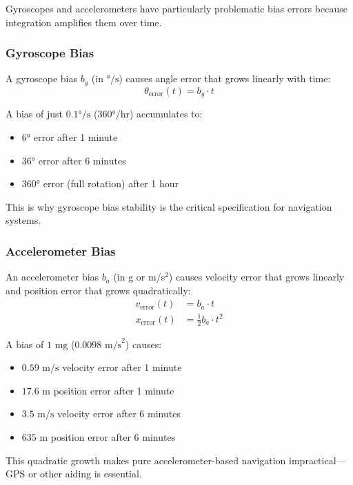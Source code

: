Gyroscopes and accelerometers have particularly problematic bias errors because integration amplifies them over time.

\subsubsection{Gyroscope Bias}

A gyroscope bias $b_g$ (in $°/\text{s}$) causes angle error that grows linearly with time:
\begin{equation}
\theta_{\text{error}}(t) = b_g \cdot t
\label{eq:gyro_bias_error}
\end{equation}

A bias of just $0.1°/\text{s}$ ($360°/\text{hr}$) accumulates to:
\begin{itemize}
    \item $6°$ error after 1 minute
    \item $36°$ error after 6 minutes
    \item $360°$ error (full rotation) after 1 hour
\end{itemize}

This is why gyroscope bias stability is the critical specification for navigation systems.

\subsubsection{Accelerometer Bias}

An accelerometer bias $b_a$ (in g or m/s$^2$) causes velocity error that grows linearly and position error that grows quadratically:
\begin{align}
v_{\text{error}}(t) &= b_a \cdot t \label{eq:accel_bias_velocity}\\
x_{\text{error}}(t) &= \frac{1}{2} b_a \cdot t^2 \label{eq:accel_bias_position}
\end{align}

A bias of $1\text{ mg}$ ($0.0098\text{ m/s}^2$) causes:
\begin{itemize}
    \item $0.59\text{ m/s}$ velocity error after 1 minute
    \item $17.6\text{ m}$ position error after 1 minute
    \item $3.5\text{ m/s}$ velocity error after 6 minutes
    \item $635\text{ m}$ position error after 6 minutes
\end{itemize}

This quadratic growth makes pure accelerometer-based navigation impractical---GPS or other aiding is essential.

